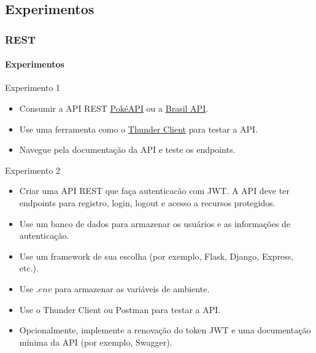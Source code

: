 \documentclass[
	9pt, %
	t, %
]{beamer}
\begin{document}
\subsection{Experimentos}

\begin{frame}
	\frametitle{REST}
	\framesubtitle{Experimentos}
	{\small
		\begin{block}{Experimento 1}
			\begin{itemize}
				\item Consumir a API REST \href{https://pokeapi.co/}{PokéAPI} ou a
				      \href{https://brasilapi.com.br/docs}{Brasil API}.
				\item Use uma ferramenta como o \href{https://www.thunderclient.com/}{Thunder Client}
				      para testar a API.
				\item Navegue pela documentação da API e teste os endpoints.
			\end{itemize}
		\end{block}

		\begin{block}{Experimento 2}
			\begin{itemize}
				\item Criar uma API REST que faça autenticacão com JWT. A API deve ter endpoints para
				      registro, login, logout e acesso a recursos protegidos.
				\item Use um banco de dados para armazenar os usuários e as informações de
				      autenticação.
				\item Use um framework de sua escolha (por exemplo, Flask, Django, Express, etc.).
				\item Use $.env$ para armazenar as variáveis de ambiente.
				\item Use o Thunder Client ou Postman para testar a API.
				\item Opcionalmente, implemente a renovação do token JWT e uma documentação mínima da
				      API (por exemplo, Swagger).
			\end{itemize}
		\end{block}
	}

\end{frame}
\end{document}
